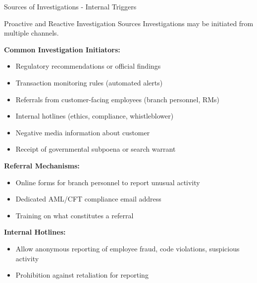 \documentclass[11pt,a4paper]{beamer}
\begin{document}
	\begin{frame}{Sources of Investigations - Internal Triggers}
		\begin{block}{Proactive and Reactive Investigation Sources}
			Investigations may be initiated from multiple channels.
		\end{block}
		\textbf{Common Investigation Initiators:}
		\begin{itemize}
			\item Regulatory recommendations or official findings
			\item Transaction monitoring rules (automated alerts)
			\item Referrals from customer-facing employees (branch personnel, RMs)
			\item Internal hotlines (ethics, compliance, whistleblower)
			\item Negative media information about customer
			\item Receipt of governmental subpoena or search warrant
		\end{itemize}
		\textbf{Referral Mechanisms:}
		\begin{itemize}
			\item Online forms for branch personnel to report unusual activity
			\item Dedicated AML/CFT compliance email address
			\item Training on what constitutes a referral
		\end{itemize}
		\textbf{Internal Hotlines:}
		\begin{itemize}
		\item	Allow anonymous reporting of employee fraud, code violations, suspicious activity
		\item	Prohibition against retaliation for reporting
		\end{itemize}
	\end{frame}
	
\end{document}
